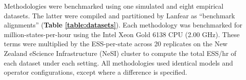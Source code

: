 \documentclass[10pt,letterpaper]{article}
\begin{document}
Methodologies were benchmarked using one simulated and eight empirical datasets.
The latter were compiled \cite{lanfear2019Github} and partitioned \cite{lanfear2016partitionfinder} by Lanfear as ``benchmark alignments'' (\textbf{Table \ref{table:datasets}}).
Each methodology was benchmarked for million-states-per-hour using the Intel Xeon Gold 6138 CPU (2.00 GHz).
These terms were multiplied by the ESS-per-state across 20 replicates on the New Zealand eScience Infrastructure (NeSI) cluster to compute the total ESS/hr of each dataset under each setting.
All methodologies used identical models and operator configurations, except where a difference is specified.


\end{document}
